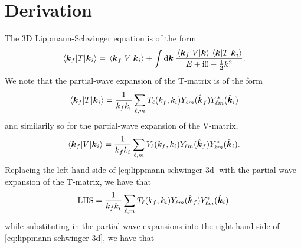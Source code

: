 \documentclass{article}
\begin{document}
\clearpage

\section{Derivation}
\label{sec:derivation}

The 3D Lippmann-Schwinger equation is of the form
\begin{equation}
  \label{eq:lippmann-schwinger-3d}
  \mel{\boldsymbol{k}_{f}}{T}{\boldsymbol{k}_{i}}
  =
  \mel{\boldsymbol{k}_{f}}{V}{\boldsymbol{k}_{i}}
  +
  \int
  \dd{\boldsymbol{k}}
  \dfrac
  {
    \mel{\boldsymbol{k}_{f}}{V}{\boldsymbol{k}}
    \mel{\boldsymbol{k}}{T}{\boldsymbol{k}_{i}}
  }
  {
    E
    +
    \mathrm{i} 0
    -
    \tfrac{1}{2}
    k^{2}
  }
  .
\end{equation}
We note that the partial-wave expansion of the T-matrix is of the form
\begin{equation}
  \label{eq:partial-wave-t}
  \mel{\boldsymbol{k}_{f}}{T}{\boldsymbol{k}_{i}}
  =
  \dfrac{1}{k_{f} k_{i}}
  \sum_{\ell, m}
  T_{\ell}(k_{f}, k_{i})
  Y_{\ell m}(\hat{\boldsymbol{k}}_{f})
  Y_{\ell m}^{*}(\hat{\boldsymbol{k}}_{i})
\end{equation}
and similarily so for the partial-wave expansion of the V-matrix,
\begin{equation}
  \label{eq:partial-wave-v}
  \mel{\boldsymbol{k}_{f}}{V}{\boldsymbol{k}_{i}}
  =
  \dfrac{1}{k_{f} k_{i}}
  \sum_{\ell, m}
  V_{\ell}(k_{f}, k_{i})
  Y_{\ell m}(\hat{\boldsymbol{k}}_{f})
  Y_{\ell m}^{*}(\hat{\boldsymbol{k}}_{i})
  .
\end{equation}
Replacing the left hand side of \autoref{eq:lippmann-schwinger-3d} with the
partial-wave expansion of the T-matrix, we have that
\begin{equation*}
  \mathrm{LHS}
  =
  \dfrac{1}{k_{f} k_{i}}
  \sum_{\ell, m}
  T_{\ell}(k_{f}, k_{i})
  Y_{\ell m}(\hat{\boldsymbol{k}}_{f})
  Y_{\ell m}^{*}(\hat{\boldsymbol{k}}_{i})
\end{equation*}
while substituting in the partial-wave expansions into the right hand side of
\autoref{eq:lippmann-schwinger-3d}, we have that
\end{document}
